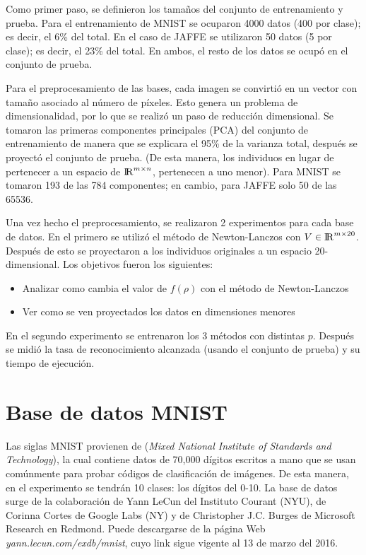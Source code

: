 Como primer paso, se definieron los tamaños del conjunto de entrenamiento y prueba. Para el entrenamiento de MNIST se ocuparon 4000 datos (400 por clase); es decir, el 6\% del total. En el caso de JAFFE se utilizaron 50 datos (5 por clase); es decir, el 23\% del total. En ambos, el resto de los datos se ocupó en el conjunto de prueba. 

Para el preprocesamiento de las bases, cada imagen se convirtió en un vector con tamaño asociado al número de píxeles. Esto genera un problema de dimensionalidad, por lo que se realizó un paso de reducción dimensional. Se tomaron las primeras componentes principales (PCA) del conjunto de entrenamiento de manera que se explicara el 95\% de la varianza total, después se proyectó el conjunto de prueba. (De esta manera, los individuos en lugar de pertenecer a un espacio de ${\rm I\!R}^{m \times n}$, pertenecen a uno menor). Para MNIST se tomaron 193 de las 784 componentes; en cambio, para JAFFE solo 50 de las 65536. 

Una vez hecho el preprocesamiento, se realizaron 2 experimentos para cada base de datos. En el primero se utilizó el método de Newton-Lanczos con $V \in {\rm I\!R}^{m \times 20}$. Después de esto se proyectaron a los individuos originales a un espacio 20-dimensional. Los objetivos fueron los siguientes: 

\begin{itemize}
\item Analizar como cambia el valor de $f(\rho)$ con el método de Newton-Lanczos
\item Ver como se ven proyectados los datos en dimensiones menores
\end{itemize}

En el segundo experimento se entrenaron los 3 métodos con distintas $p$. Después se midió la tasa de reconocimiento alcanzada (usando el conjunto de prueba) y su tiempo de ejecución. 

\section{Base de datos MNIST}

Las siglas MNIST provienen de (\textit{Mixed National Institute of Standards and Technology}), la cual contiene datos de 70,000 dígitos escritos a mano que se usan comúnmente para probar códigos de clasificación de imágenes. De esta manera, en el experimento se tendrán 10 clases: los dígitos del 0-10. La base de datos surge de la colaboración de Yann LeCun del Instituto Courant (NYU), de Corinna Cortes de Google Labs (NY) y de Christopher J.C. Burges de Microsoft Research en Redmond. Puede descargarse de la página Web \textit{yann.lecun.com/exdb/mnist}, cuyo link sigue vigente al 13 de marzo del 2016.

